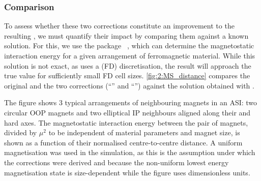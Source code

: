 \subsubsection{Comparison}
To assess whether these two corrections constitute an improvement to the resulting , we must quantify their impact by comparing them against a known solution.
For this, we use the  package \mumax~\cite{mumax3}, which can determine the magnetostatic interaction energy for a given arrangement of ferromagnetic material.
While this solution is not exact, as \mumax uses a  (FD) discretisation, the result will approach the true value for sufficiently small FD cell sizes.
\cref{fig:2:MS_distance} compares the original  and the two corrections (``'' and ``'') against the solution obtained with \mumax.


The figure shows 3 typical arrangements of neighbouring magnets in an ASI: two circular OOP magnets and two elliptical IP neighbours aligned along their  and hard axes.
The magnetostatic interaction energy between the pair of magnets, divided by $\mu^2$ to be independent of material parameters and magnet size, is shown as a function of their normalised centre-to-centre distance.
A uniform magnetisation was used in the \mumax simulation, as this is the assumption under which the corrections were derived and because the non-uniform lowest energy magnetisation state is size-dependent while the figure uses dimensionless units. \\\par


